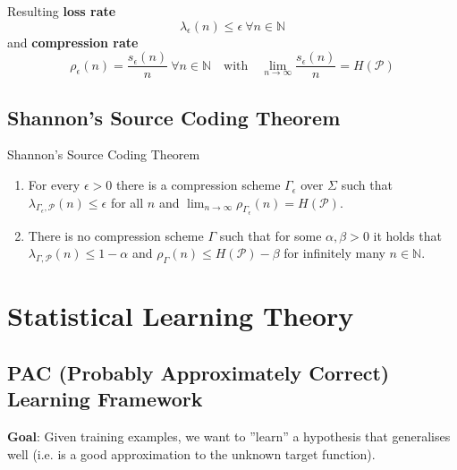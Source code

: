 \documentclass[english]{panikzettel}
\begin{document}
Resulting \textbf{loss rate}
\[
\lambda_\epsilon(n)\leq \epsilon \ \forall n\in\mathbb{N}
\]
and \textbf{compression rate}
$$
\rho_\epsilon(n)=\frac{s_\epsilon(n)}{n} \ \forall n\in\mathbb{N}
\quad \text{with} \quad
\lim_{n \rightarrow \infty} \frac{s_\epsilon(n)}{n} = H(\mathcal{P})
$$

\subsection{Shannon’s Source Coding Theorem}
\begin{theo}{Shannon’s Source Coding Theorem}
\begin{enumerate}[leftmargin=*]
\item For every $\epsilon>0$ there is a compression scheme $\Gamma_\epsilon$ over $\Sigma$ such that $\lambda_{\Gamma_\epsilon, \mathcal{P}}(n)\leq \epsilon$ for all $n$ and $\lim_{n\to \infty}\rho_{\Gamma_\epsilon}(n)=H(\mathcal{P})$.
\item There is no compression scheme $\Gamma$ such that for some $\alpha,\beta>0$ it holds that $\lambda_{\Gamma, \mathcal{P}}(n)\leq 1-\alpha$ and $\rho_\Gamma(n)\leq H(\mathcal{P})-\beta$ for infinitely many $n\in \mathbb{N}$.
\end{enumerate}
\end{theo}


\section{Statistical Learning Theory}
\subsection{PAC (Probably Approximately Correct) Learning Framework}

\textbf{Goal}: Given training examples, we want to ''learn'' a hypothesis that generalises well (i.e. is a good approximation to the unknown target function).
\end{document}
